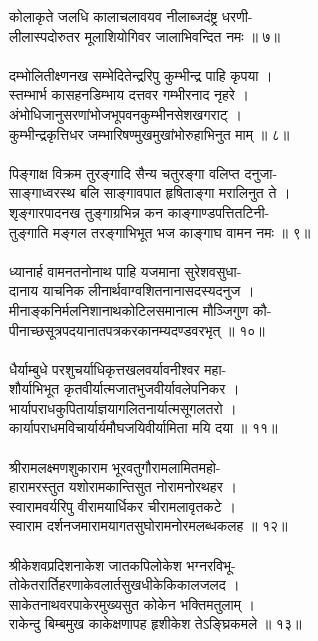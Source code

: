 कोलाकृते जलधि कालाचलावयव नीलाब्जदंष्ट्र धरणी-\\
लीलास्पदोरुतर मूलाशियोगिवर जालाभिवन्दित नमः  ॥ ७॥\\
\\
दम्भोलितीक्ष्णनख सम्भेदितेन्द्ररिपु कुम्भीन्द्र पाहि कृपया  ।\\
स्तम्भार्भ कासहनडिम्भाय दत्तवर गम्भीरनाद नृहरे  ।\\
अंभोधिजानुसरणांभोजभूपवनकुम्भीनसेशखगराट्  ।\\
कुम्भीन्द्रकृत्तिधर जम्भारिषण्मुखमुखांभोरुहाभिनुत माम्  ॥ ८॥\\
\\
पिङ्गाक्ष विक्रम तुरङ्गादि सैन्य चतुरङ्गा वलिप्त दनुजा-\\
साङ्गाध्वरस्थ बलि साङ्गावपात हृषिताङ्गा मरालिनुत ते  ।\\
श‍ृङ्गारपादनख तुङ्गाग्रभिन्न कन काङ्गाण्डपत्तितटिनी-\\
तुङ्गाति मङ्गल तरङ्गाभिभूत भज काङ्गाघ वामन नमः  ॥ ९॥\\
\\
ध्यानार्ह वामनतनोनाथ पाहि यजमाना सुरेशवसुधा-\\
दानाय याचनिक लीनार्थवाग्वशितनानासदस्यदनुज  ।\\
मीनाङ्कनिर्मलनिशानाथकोटिलसमानात्म मौञ्जिगुण कौ-\\
पीनाच्छसूत्रपदयानातपत्रकरकानम्यदण्डवरभृत्  ॥ १०॥\\
\\
धैर्याम्बुधे परशुचर्याधिकृत्तखलवर्यावनीश्वर महा-\\
शौर्याभिभूत कृतवीर्यात्मजातभुजवीर्यावलेपनिकर  ।\\
भार्यापराधकुपितार्याज्ञयागलितनार्यात्मसूगलतरो  ।\\
कार्यापराधमविचार्यार्यमौघजयिवीर्यामिता मयि दया  ॥ ११॥\\
\\
श्रीरामलक्ष्मणशुकाराम भूरवतुगौरामलामितमहो-\\
हारामरस्तुत यशोरामकान्तिसुत नोरामनोरथहर  ।\\
स्वारामवर्यरिपु वीरामयार्धिकर चीरामलावृतकटे ।\\
स्वाराम दर्शनजमारामयागतसुघोरामनोरमलब्धकलह  ॥ १२॥\\
\\
श्रीकेशवप्रदिशनाकेश जातकपिलोकेश भग्नरविभू-\\
तोकेतरार्तिहरणाकेवलार्तसुखधीकेकिकालजलद  ।\\
साकेतनाथवरपाकेरमुख्यसुत कोकेन भक्तिमतुलाम्  ।\\
राकेन्दु बिम्बमुख काकेक्षणापह हृशीकेश तेऽङ्घ्रिकमले  ॥ १३॥\\
